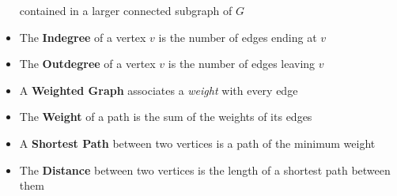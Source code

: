 \begin{itemize}
contained in a larger connected subgraph of $G$
\item The \textbf{Indegree} of a vertex $v$ is the number of
edges ending at $v$
\item The \textbf{Outdegree} of a vertex $v$ is the number of
edges leaving $v$
\item A \textbf{Weighted Graph} associates a \textit{weight} with
every edge
\item The \textbf{Weight} of a path is the sum of the
weights of its edges
\item A \textbf{Shortest Path} between two vertices is a
path of the minimum weight
\item The \textbf{Distance} between two vertices is the
length of a shortest path between them
\end{itemize}
